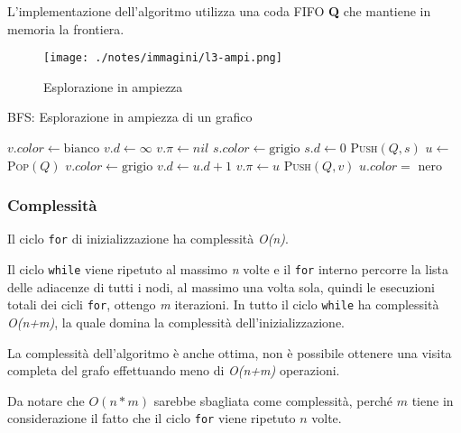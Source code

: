 L'implementazione dell'algoritmo utilizza una coda FIFO \textbf{Q} che
mantiene in memoria la frontiera.

\begin{figure}[htbp]
\centering
\texttt{[image: ./notes/immagini/l3-ampi.png]}
\caption{Esplorazione in ampiezza}
\end{figure}

\begin{breakablealgorithm}
	\caption{BFS: Esplorazione in ampiezza di un grafico}
	\begin{algorithmic}[1]
				\State $ v.color \gets \text{bianco} $ 
				\State $ v.d \gets \infty $
				\State $ v.\pi \gets nil $
			\EndFor
			\State $ s.color \gets \text{grigio} $
			\State $ s.d \gets 0 $
			\State \textsc{Push}$ (Q,s)$
				\State $ u \gets $ \textsc{Pop}$ (Q) $
						\State $ v.color \gets \text{grigio} $ 
						\State $ v.d \gets u.d + 1 $
						\State $ v.\pi \gets u $
						\State \textsc{Push}$ (Q,v) $
					\EndIf
				\EndFor
				\State $ u.color = $ nero
			\EndWhile
		\EndFunction
	\end{algorithmic}
\end{breakablealgorithm}

\subsubsection{Complessità}\label{complessituxe0}

Il ciclo \texttt{for} di inizializzazione ha complessità \emph{O(n)}.

Il ciclo \texttt{while} viene ripetuto al massimo \emph{n} volte e il
\texttt{for} interno percorre la lista delle adiacenze di tutti i nodi,
al massimo una volta sola, quindi le esecuzioni totali dei cicli
\texttt{for}, ottengo \emph{m} iterazioni. In tutto il ciclo
\texttt{while} ha complessità \emph{O(n+m)}, la quale domina la
complessità dell'inizializzazione.

La complessità dell'algoritmo è anche ottima, non è possibile ottenere
una visita completa del grafo effettuando meno di \emph{O(n+m)}
operazioni.

Da notare che $O(n*m)$ sarebbe sbagliata come complessità, perché $m$
tiene in considerazione il fatto che il ciclo \texttt{for} viene
ripetuto $n$ volte.

